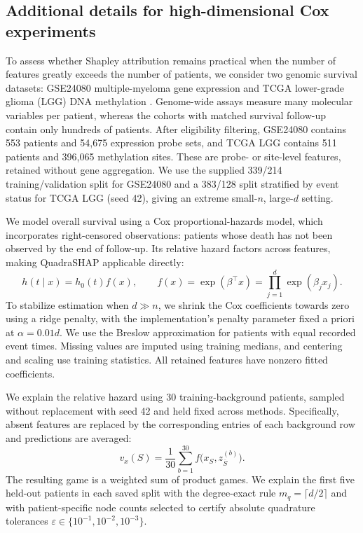 \subsection{Additional details for high-dimensional Cox experiments}
\label{app:cox-device-exact}

To assess whether Shapley attribution remains practical when the number of
features greatly exceeds the number of patients, we consider two genomic
survival datasets: GSE24080 multiple-myeloma gene expression
\cite{geo_gse24080} and TCGA lower-grade glioma (LGG) DNA methylation
\cite{tcga_lgg_methylation}.
Genome-wide assays measure many molecular variables per patient, whereas
the cohorts with matched survival follow-up contain only hundreds of patients.
After eligibility filtering, GSE24080 contains 553 patients and 54,675
expression probe sets, and TCGA LGG contains 511 patients and 396,065
methylation sites. These are probe- or site-level features, retained without
gene aggregation. We use the supplied 339/214 training/validation split
for GSE24080 and a 383/128 split stratified by event status for TCGA LGG
(seed 42), giving an extreme small-$n$, large-$d$ setting.

We model overall survival using a Cox proportional-hazards model, which
incorporates right-censored observations: patients whose death has not been
observed by the end of follow-up. Its relative hazard factors across features,
making QuadraSHAP applicable directly:
\[
h(t\mid x)=h_0(t)f(x),
\qquad
f(x)=\exp(\beta^\top x)=\prod_{j=1}^{d}\exp(\beta_jx_j).
\]
To stabilize estimation when $d\gg n$, we shrink the Cox coefficients
towards zero using a ridge penalty, with the implementation's penalty
parameter fixed a priori at $\alpha=0.01d$. We use the Breslow approximation
for patients with equal recorded event times. Missing values are imputed using
training medians, and centering and scaling use training statistics.
All retained features have nonzero fitted coefficients.

We explain the relative hazard using 30 training-background patients,
sampled without replacement with seed 42 and held fixed across methods.
Specifically, absent features are replaced by the corresponding entries
of each background row and predictions are averaged:
\[
v_x(S)=\frac{1}{30}\sum_{b=1}^{30}
f\bigl(x_S,z^{(b)}_{\overline S}\bigr).
\]
The resulting game is a weighted sum of product games. We explain the
first five held-out patients in each saved split with the degree-exact rule
$m_q=\lceil d/2\rceil$ and with patient-specific node counts selected
to certify absolute quadrature tolerances
$\varepsilon\in\{10^{-1},10^{-2},10^{-3}\}$.

